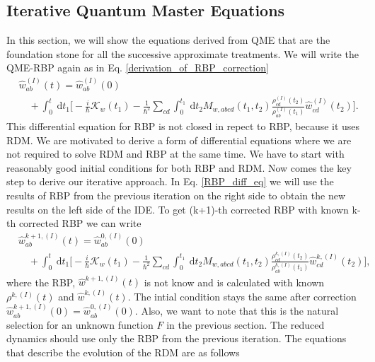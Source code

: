 \subsection{Iterative Quantum Master Equations}
In this section, we will show the equations derived from QME that are the foundation stone for all the successive approximate treatments. We will write the QME-RBP again as in Eq. \ref{derivation_of_RBP_correction}
\begin{equation}
    \begin{aligned}
    &\hat{w}^{(I)}_{ab}(t) = \hat{w}^{(I)}_{ab}(0)   \\
     &\quad+\int_{0}^{t} \mathrm{~d} t_1 \Big[ -\frac{i}{\hbar} \mathcal{K}_w(t_1) -\frac{1}{\hbar^{2}} \sum_{cd}\int_{0}^{t_1} \mathrm{~d} t_2 M_{w, abcd} (t_1, t_2) \frac{\rho^{(I)}_{cd}(t_2) }{ \rho^{(I)}_{ab}(t_1)}\hat{w}^{(I)}_{cd}(t_2) \Big].
    \end{aligned}
\end{equation}
This differential equation for RBP is not closed in repect to RBP, because it uses RDM. We are motivated to derive a form of differential equations where we are not required to solve RDM and RBP at the same time. We have to start with reasonably good initial conditions for both RBP and RDM. Now comes the key step to derive our iterative approach. In Eq. \ref{RBP_diff_eq} we will use the results of RBP from the previous iteration on the right side to obtain the new results on the left side of the IDE. To get (k+1)-th corrected RBP with known k-th corrected RBP we can write 
\begin{equation}
\label{ansatz_RBP_iterative}
    \begin{aligned}
    &\hat{w}^{k+1,(I)}_{ab}(t) = \hat{w}^{0, (I)}_{ab}(0)   \\
     &\quad+\int_{0}^{t} \mathrm{~d} t_1 \Big[ -\frac{i}{\hbar} \mathcal{K}_w(t_1) -\frac{1}{\hbar^{2}} \sum_{cd}\int_{0}^{t_1} \mathrm{~d} t_2 M_{w, abcd} (t_1, t_2) \frac{\rho^{k, (I)}_{cd}(t_2) }{ \rho^{k, (I)}_{ab}(t_1)}\hat{w}^{k, (I)}_{cd}(t_2) \Big],
    \end{aligned}
\end{equation}
where the RBP, $\hat{w}^{k+1,(I)}(t)$ is not know and is calculated with known $\rho^{k, (I)}(t)$ and $\hat{w}^{k,(I)}(t)$. The intial condition stays the same after correction \newline $\hat{w}^{k+1, (I)}_{ab}(0) = \hat{w}^{0, (I)}_{ab}(0)$. Also, we want to note that this is the natural selection for an unknown function $F$ in the previous section. The reduced dynamics should use only the RBP from the previous iteration. The equations that describe the evolution of the RDM are as follows 
